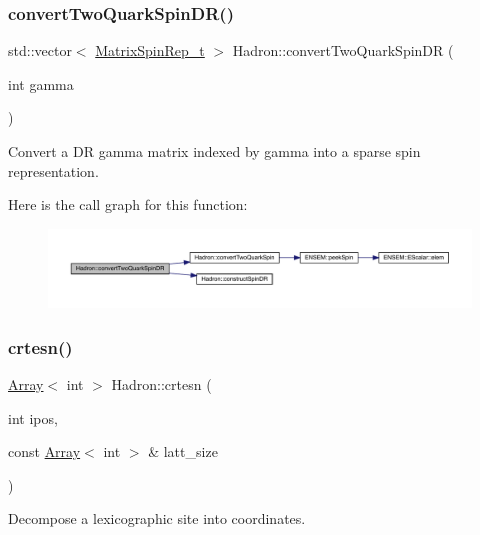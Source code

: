 \subsubsection{\texorpdfstring{convertTwoQuarkSpinDR()}{convertTwoQuarkSpinDR()}}
{\footnotesize\ttfamily std\+::vector$<$ \mbox{\hyperlink{structHadron_1_1MatrixSpinRep__t}{Matrix\+Spin\+Rep\+\_\+t}} $>$ Hadron\+::convert\+Two\+Quark\+Spin\+DR (\begin{DoxyParamCaption}\item[{int}]{gamma }\end{DoxyParamCaption})}



Convert a DR gamma matrix indexed by gamma into a sparse spin representation. 

Here is the call graph for this function\+:
\nopagebreak
\begin{figure}[H]
\begin{center}
\leavevmode
\includegraphics[width=350pt]{d1/daf/namespaceHadron_aadefc7d519d40f16cb37c4df644944e7_cgraph}
\end{center}
\end{figure}
\mbox{\label{namespaceHadron_a10fe1c3c465ac8dd8b6edab007aa6ab7}} 
\subsubsection{\texorpdfstring{crtesn()}{crtesn()}}
{\footnotesize\ttfamily \mbox{\hyperlink{classXMLArray_1_1Array}{Array}}$<$ int $>$ Hadron\+::crtesn (\begin{DoxyParamCaption}\item[{int}]{ipos,  }\item[{const \mbox{\hyperlink{classXMLArray_1_1Array}{Array}}$<$ int $>$ \&}]{latt\+\_\+size }\end{DoxyParamCaption})}



Decompose a lexicographic site into coordinates. 

